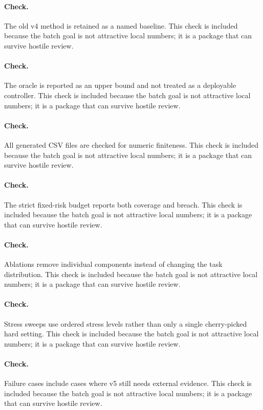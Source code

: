 \documentclass{article}
\begin{document}
\paragraph{Check.} The old v4 method is retained as a named baseline. This check is included because the batch goal is not attractive local numbers; it is a package that can survive hostile review.
\paragraph{Check.} The oracle is reported as an upper bound and not treated as a deployable controller. This check is included because the batch goal is not attractive local numbers; it is a package that can survive hostile review.
\paragraph{Check.} All generated CSV files are checked for numeric finiteness. This check is included because the batch goal is not attractive local numbers; it is a package that can survive hostile review.
\paragraph{Check.} The strict fixed-risk budget reports both coverage and breach. This check is included because the batch goal is not attractive local numbers; it is a package that can survive hostile review.
\paragraph{Check.} Ablations remove individual components instead of changing the task distribution. This check is included because the batch goal is not attractive local numbers; it is a package that can survive hostile review.
\paragraph{Check.} Stress sweeps use ordered stress levels rather than only a single cherry-picked hard setting. This check is included because the batch goal is not attractive local numbers; it is a package that can survive hostile review.
\paragraph{Check.} Failure cases include cases where v5 still needs external evidence. This check is included because the batch goal is not attractive local numbers; it is a package that can survive hostile review.
\end{document}
